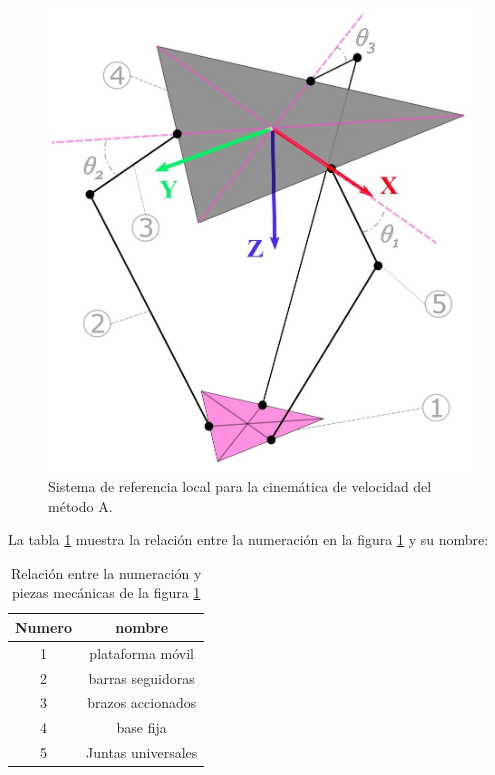         \begin{figure}[htb]
             \centering
             \includegraphics[width=0.62\linewidth]{Main/Chapter4/Images4/DIBUJO18.jpg}
              \caption{Sistema de referencia local para la cinemática de velocidad del método A. }
              \label{f:Cap4_Metodo_A_Modelacion_Cinematica_Posicion_7}
        \end{figure}
 
          La tabla \ref{tab:cap4_tabla_5} muestra la relación entre la numeración en la figura \ref{f:Cap4_Metodo_A_Modelacion_Cinematica_Posicion_7}  y su nombre:
        
        \begin{table}[h]
            \centering
            \begin{tabular}{c c}
            \hline
                \textbf{Numero}& \textbf{nombre} \\ 
            \hline             \hline
             1 & plataforma móvil \\
            \hline
             2 & barras seguidoras \\
            \hline
             3 & brazos accionados \\
            \hline
             4 & base fija\\
            \hline
             5 & Juntas universales \\
             \hline
            \end{tabular}
           \caption{Relación entre la numeración y piezas mecánicas de la figura  \ref{f:Cap4_Metodo_A_Modelacion_Cinematica_Posicion_7}}
           \label{tab:cap4_tabla_5}
        \end{table}
        
